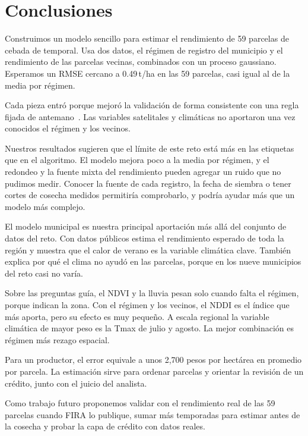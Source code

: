 \section{Conclusiones}\label{sec:conclusiones}

Construimos un modelo sencillo para estimar el rendimiento de 59 parcelas de cebada de temporal. Usa dos datos, el
régimen de registro del municipio y el rendimiento de las parcelas vecinas, combinados con un proceso gaussiano.
Esperamos un RMSE cercano a 0.49\,t/ha en las 59 parcelas, casi igual al de la media por régimen.

Cada pieza entró porque mejoró la validación de forma consistente con una regla fijada de antemano~\cite{doc_modelo}.
Las variables satelitales y climáticas no aportaron una vez conocidos el régimen y los vecinos.

Nuestros resultados sugieren que el límite de este reto está más en las etiquetas que en el algoritmo. El modelo mejora
poco a la media por régimen, y el redondeo y la fuente mixta del rendimiento pueden agregar un ruido que no pudimos
medir. Conocer la fuente de cada registro, la fecha de siembra o tener cortes de cosecha medidos permitiría comprobarlo,
y podría ayudar más que un modelo más complejo.

El modelo municipal es nuestra principal aportación más allá del conjunto de datos del reto. Con datos públicos estima
el rendimiento esperado de toda la región y muestra que el calor de verano es la variable climática clave. También
explica por qué el clima no ayudó en las parcelas, porque en los nueve municipios del reto casi no varía.

Sobre las preguntas guía, el NDVI y la lluvia pesan solo cuando falta el régimen, porque indican la zona. Con el régimen
y los vecinos, el NDDI es el índice que más aporta, pero su efecto es muy pequeño. A escala regional la variable
climática de mayor peso es la Tmax de julio y agosto. La mejor combinación es régimen más
rezago espacial.

Para un productor, el error equivale a unos 2,700 pesos por hectárea en promedio por parcela. La estimación sirve para ordenar parcelas y
orientar la revisión de un crédito, junto con el juicio del analista.

Como trabajo futuro proponemos validar con el rendimiento real de las 59 parcelas cuando FIRA lo publique, sumar más
temporadas para estimar antes de la cosecha y probar la capa de crédito con datos reales.
